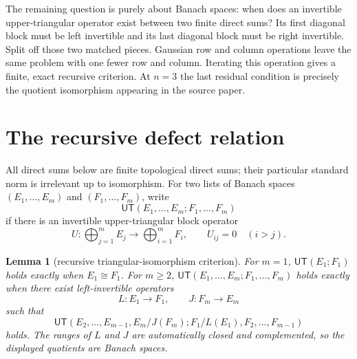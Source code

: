\documentclass[11pt]{article}
\newtheorem{lemma}[theorem]{Lemma}
\newcommand{\UT}{\mathsf{UT}}
\begin{document}
The remaining question is purely about Banach spaces: when does an invertible
upper-triangular operator exist between two finite direct sums?  Its first
diagonal block must be left invertible and its last diagonal block must be
right invertible.  Split off those two matched pieces.  Gaussian row and
column operations leave the same problem with one fewer row and column.
Iterating this operation gives a finite, exact recursive criterion.  At
$n=3$ the last residual condition is precisely the quotient isomorphism
appearing in the source paper.

\section{The recursive defect relation}

All direct sums below are finite topological direct sums; their particular
standard norm is irrelevant up to isomorphism.  For two lists of Banach
spaces $(E_1,\ldots,E_m)$ and $(F_1,\ldots,F_m)$, write
\[
 \UT(E_1,\ldots,E_m;F_1,\ldots,F_m)
\]
if there is an invertible upper-triangular block operator
\[
 U:\bigoplus_{j=1}^m E_j\longrightarrow\bigoplus_{i=1}^m F_i,
 \qquad U_{ij}=0\quad(i>j).
\]

\begin{lemma}[recursive triangular-isomorphism criterion]\label{lem:rec}
For $m=1$, $\UT(E_1;F_1)$ holds exactly when $E_1\cong F_1$.
For $m\geq2$, $\UT(E_1,\ldots,E_m;F_1,\ldots,F_m)$ holds exactly when there
exist left-invertible operators
\[
 L:E_1\to F_1,\qquad J:F_m\to E_m
\]
such that
\begin{equation}\label{eq:recursion}
 \UT\left(E_2,\ldots,E_{m-1},E_m/J(F_m);
 F_1/L(E_1),F_2,\ldots,F_{m-1}\right)
\end{equation}
holds.  The ranges of $L$ and $J$ are automatically closed and complemented,
so the displayed quotients are Banach spaces.
\end{lemma}
\end{document}
